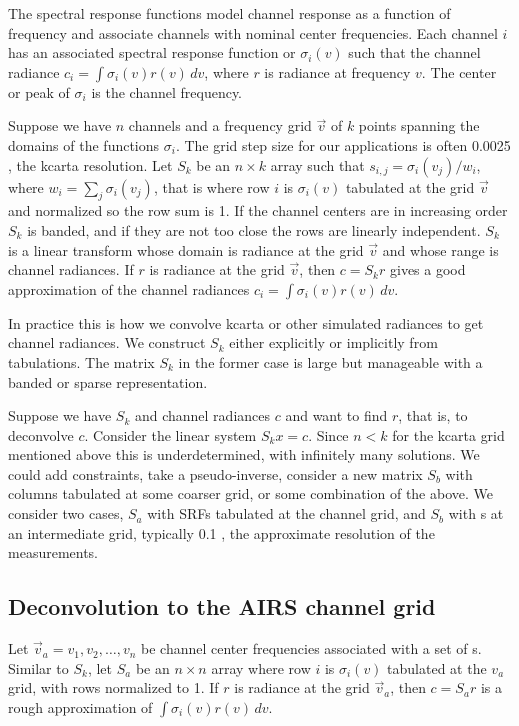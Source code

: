 \documentclass[12pt]{article}
\begin{document}
The {\airs} spectral response functions model channel response as 
a function of frequency and associate channels with nominal center
frequencies.  Each {\airs} channel $i$ has an associated spectral
response function or {\srf} $\sigma_i(v)$ such that the channel
radiance $c_i = \int \sigma_i(v)r(v)\,dv$, where $r$ is radiance at
frequency $v$.  The center or peak of $\sigma_i$ is the channel
frequency.

Suppose we have $n$ channels and a frequency grid $\vec v$ of $k$
points spanning the domains of the functions $\sigma_i$.  The grid
step size for our applications is often 0.0025 {\wn}, the kcarta
resolution.  Let $S_k$ be an $n\times k$ array such that $s_{i,j} =
\sigma_i(v_j)/w_i$, where $w_i = \sum_j \sigma_i(v_j)$, that is
where row $i$ is $\sigma_i(v)$ tabulated at the grid $\vec v$ and
normalized so the row sum is 1.  If the channel centers are in
increasing order $S_k$ is banded, and if they are not too close the
rows are linearly independent.  $S_k$ is a linear transform whose
domain is radiance at the grid $\vec v$ and whose range is channel
radiances.  If $r$ is radiance at the grid $\vec v$, then $c = S_k r$
gives a good approximation of the channel radiances $c_i = 
\int\sigma_i(v)r(v)\,dv$.

In practice this is how we convolve kcarta or other simulated
radiances to get {\airs} channel radiances.  We construct $S_k$
either explicitly or implicitly from {\airs} {\srf} tabulations.
The matrix $S_k$ in the former case is large but manageable with a
banded or sparse representation.

Suppose we have $S_k$ and channel radiances $c$ and want to find
$r$, that is, to deconvolve $c$.  Consider the linear system $S_k x
= c$.  Since $n < k$ for the kcarta grid mentioned above this is
underdetermined, with infinitely many solutions.  We could add
constraints, take a pseudo-inverse, consider a new matrix $S_b$ with
columns tabulated at some coarser grid, or some combination of the
above.  We consider two cases, $S_a$ with SRFs tabulated at the
{\airs} channel grid, and $S_b$ with {\srf}s at an intermediate
grid, typically 0.1 {\wn}, the approximate resolution of the {\srf}
measurements.

\subsection{Deconvolution to the AIRS channel grid}

Let $\vec v_a = v_1,v_2,\ldots,v_n$ be channel center frequencies
associated with a set of {\srf}s.  Similar to $S_k$, let $S_a$ be an
$n\times n$ array where row $i$ is $\sigma_i(v)$ tabulated at the
$v_a$ grid, with rows normalized to 1.  If $r$ is radiance at the
grid $\vec v_a$, then $c = S_a r$ is a rough approximation of
$\int\sigma_i(v)r(v)\,dv$.
\end{document}
